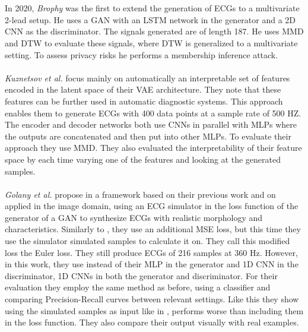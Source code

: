 \\ \\
In 2020, \textit{Brophy} \cite{brophy_synthesis_2020} was the first to extend the generation of ECGs to a multivariate 2-lead setup. He uses a GAN with an LSTM network in the generator and a 2D CNN as the discriminator. The signals generated are of length 187. He uses MMD and DTW to evaluate these signals, where DTW is generalized to a multivariate setting. To assess privacy risks he performs a membership inference attack.
\\ \\
\textit{Kuznetsov et al.} \cite{kuznetsov_electrocardiogram_2020} focus mainly on automatically an interpretable set of features encoded in the latent space of their VAE architecture. They note that these features can be further used in automatic diagnostic systems. This approach enables them to generate ECGs with 400 data points at a sample rate of 500 HZ. The encoder and decoder networks both use CNNs in parallel with MLPs where the outputs are concatenated and then put into other MLPs. To evaluate their approach they use MMD. They also evaluated the interpretability of their feature space by each time varying one of the features and looking at the generated samples.
\\ \\
\textit{Golany et al.} propose in \cite{golany_simgans_2020} a framework based on their previous work \cite{golany_pgans_2019} and on \cite{shrivastava_learning_2017} applied in the image domain, using an ECG simulator in the loss function of the generator of a GAN to synthesize ECGs with realistic morphology and characteristics. Similarly to \cite{golany_pgans_2019}, they use an additional MSE loss, but this time they use the simulator simulated samples to calculate it on. They call this modified loss the Euler loss. They still produce ECGs of 216 samples at 360 Hz. However, in this work, they use instead of their MLP in the generator and 1D CNN in the discriminator, 1D CNNs in both the generator and discriminator. For their evaluation they employ the same method as before, using a classifier and comparing Precision-Recall curves between relevant settings. Like this they show using the simulated samples as input like in \cite{shrivastava_learning_2017}, performs worse than including them in the loss function. They also compare their output visually with real examples.
\\ \\
